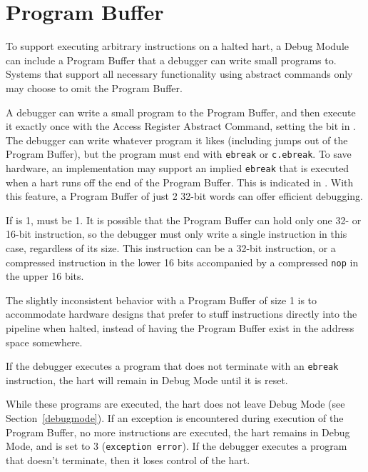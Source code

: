 \section{Program Buffer} \label{programbuffer}

To support executing arbitrary instructions on a halted hart,
a Debug Module can include a Program Buffer that a debugger
can write small programs to. Systems
that support all necessary functionality using abstract commands
only may choose to omit the Program Buffer.

A debugger can write a small program to the Program Buffer, and then
execute it exactly once with the Access Register Abstract Command,
setting the \Fpostexec bit in \Rcommand.
The debugger can write whatever program it likes (including jumps out of the
Program Buffer), but the program must end with
{\tt ebreak} or {\tt c.ebreak}. To save hardware, an implementation may support
an implied {\tt ebreak} that is executed when a hart runs off the end of the
Program Buffer. This is indicated in \Fimpebreak. With this feature, a Program
Buffer of just 2 32-bit words can offer efficient debugging.

If \Fprogbufsize is 1, \Fimpebreak must be 1. It is possible that the Program
Buffer can hold only one 32- or 16-bit instruction, so the debugger must only
write a single instruction in this case, regardless of its size.
This instruction can be a 32-bit
instruction, or a compressed instruction in the lower 16 bits accompanied by a
compressed {\tt nop} in the upper 16 bits.

\begin{commentary}
    The slightly inconsistent behavior with a Program Buffer of size 1 is to
    accommodate hardware designs that prefer to stuff instructions directly
    into the pipeline when halted, instead of having the Program Buffer exist
    in the address space somewhere.
\end{commentary}

If the debugger executes a program that does not
terminate with an {\tt ebreak} instruction, the hart will remain in Debug Mode
until it is reset.

While these programs are executed, the hart does not leave Debug Mode (see
Section~\ref{debugmode}).  If an exception is encountered during execution of
the Program Buffer, no more instructions are executed, the hart remains in Debug
Mode, and \Fcmderr is set to 3 ({\tt exception error}).  If the debugger
executes a program that doesn't terminate, then it loses control of the hart.

